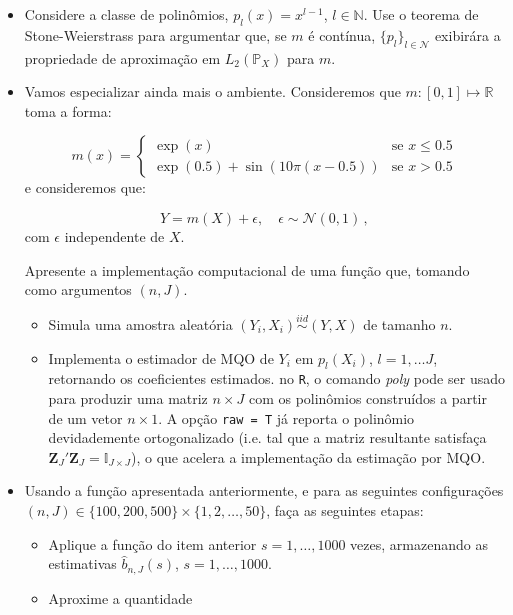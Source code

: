 \documentclass[10pt,a4paper]{article}
\begin{document}
 \begin{itemize}
 	\item[a] Considere a classe de polinômios, $p_l(x) = x^{l-1}$, $l\in \mathbb{N}$. Use o teorema de Stone-Weierstrass para argumentar que, se $m$ é contínua, $\{p_l\}_{l \in \mathcal{N}}$ exibirára a propriedade de aproximação em $L_2(\mathbb{P}_X)$ para $m$.
 	\item[b] Vamos especializar ainda mais o ambiente. Consideremos que $m: [0,1] \mapsto \mathbb{R}$ toma a forma:
 	
 	$$m(x) = \begin{cases}
 		\exp(x) & \text{se } x \leq 0.5 \\
 		\exp(0.5) + \sin(10\pi(x-0.5)) & \text{se } x> 0.5
 	\end{cases}$$
 	e consideremos que:
 	
 	$$Y = m(X) + \epsilon, \quad \epsilon \sim \mathcal{N}(0,1)\, ,$$
 	com $\epsilon$ independente de $X$.
 	
 	Apresente a implementação computacional de uma função que, tomando como argumentos $(n,J)$.
 	
 	\begin{itemize}
 		\item Simula uma amostra aleatória $(Y_i,X_i) \overset{iid}{\sim} (Y,X)$ de tamanho $n$.
 		\item Implementa o estimador de MQO de $Y_i$ em $p_{l}(X_i)$, $l=1,\ldots J$, retornando os coeficientes estimados.  no \texttt{R}, o comando \textit{poly} pode ser usado para produzir uma matriz $n \times J$ com os polinômios construídos a partir de um vetor $n \times 1$. A opção \texttt{raw = T} já reporta o polinômio devidademente ortogonalizado (i.e. tal que a matriz resultante satisfaça $\boldsymbol{Z}_J'\boldsymbol{Z}_J = \mathbb{I}_{J \times J}$), o que acelera a implementação da estimação por MQO.
 	\end{itemize}
 	
 	\item[c]  Usando a função apresentada anteriormente, e para as seguintes configurações $(n,J) \in \{100, 200, 500\} \times \{1,2,\ldots, 50\}$, faça as seguintes etapas:
 	
 	\begin{itemize}
 		\item Aplique a função do item anterior $s=1,\ldots, 1000$ vezes, armazenando as estimativas $\hat{b}_{n,J}(s)$, $s=1,\ldots, 1000$.
 		\item Aproxime a quantidade
 		

\end{itemize}
\end{itemize}
\end{document}
